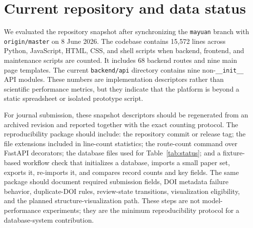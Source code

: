 \documentclass[11pt,a4paper]{article}
\begin{document}
\section{Current repository and data status}

We evaluated the repository snapshot after synchronizing the \texttt{mayuan} branch with \texttt{origin/master} on 8 June 2026. The codebase contains 15,572 lines across Python, JavaScript, HTML, CSS, and shell scripts when backend, frontend, and maintenance scripts are counted. It includes 68 backend routes and nine main page templates. The current \texttt{backend/api} directory contains nine non-\texttt{\_\_init\_\_} API modules. These numbers are implementation descriptors rather than scientific performance metrics, but they indicate that the platform is beyond a static spreadsheet or isolated prototype script.

For journal submission, these snapshot descriptors should be regenerated from an archived revision and reported together with the exact counting protocol. The reproducibility package should include: the repository commit or release tag; the file extensions included in line-count statistics; the route-count command over FastAPI decorators; the database files used for Table~\ref{tab:status}; and a fixture-based workflow check that initializes a database, imports a small paper set, exports it, re-imports it, and compares record counts and key fields. The same package should document required submission fields, DOI metadata failure behavior, duplicate-DOI rules, review-state transitions, visualization eligibility, and the planned structure-visualization path. These steps are not model-performance experiments; they are the minimum reproducibility protocol for a database-system contribution.
\end{document}
